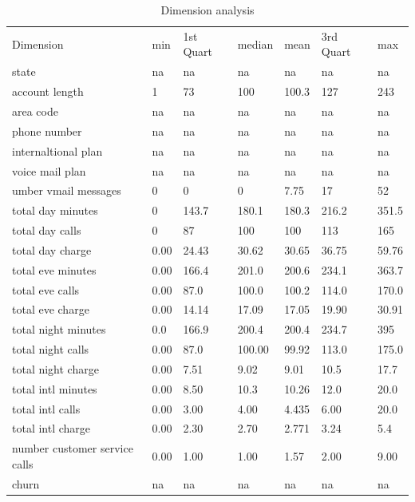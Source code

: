 \begin{table}[H]
	\centering
	\caption{Dimension analysis}
	\label{summary-dim}
	\begin{tabular}{lllllll}
		Dimension & min & 1st Quart & median & mean & 3rd Quart & max \\
state&na&na&na&na&na&na\\
account length&1&73&100&100.3&127&243\\
area code&na&na&na&na&na&na\\
phone number&na&na&na&na&na&na\\
internaltional plan&na&na&na&na&na&na\\
voice mail plan&na&na&na&na&na&na\\
umber vmail messages&0&0&0&7.75&17&52\\
total day minutes&0&143.7&180.1&180.3&216.2&351.5\\
total day calls&0&87&100&100&113&165\\
total day charge&0.00&24.43&30.62&30.65&36.75&59.76\\
total eve minutes&0.00&166.4&201.0&200.6&234.1&363.7\\
total eve calls&0.00&87.0&100.0&100.2&114.0&170.0\\
total eve charge&0.00&14.14&17.09&17.05&19.90&30.91\\
total night minutes&0.0&166.9&200.4&200.4&234.7&395\\
total night calls&0.00&87.0&100.00&99.92&113.0&175.0\\
total night charge&0.00&7.51&9.02&9.01&10.5&17.7\\
total intl minutes&0.00&8.50&10.3&10.26&12.0&20.0\\
total intl calls&0.00&3.00&4.00&4.435&6.00&20.0\\
total intl charge&0.00&2.30&2.70&2.771&3.24&5.4\\
number customer service calls&  0.00   &  1.00   &  1.00 & 1.57 & 2.00 & 9.00     \\
		churn         & na    & na          & na       &na      & na          & na   \\
		\end{tabular}
		\end{table}




